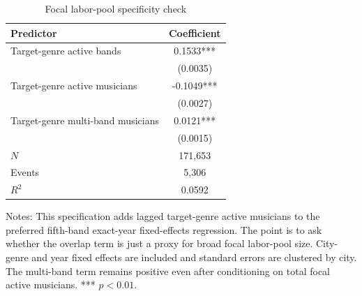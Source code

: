 \begin{table}[p]
\centering
\caption{Focal labor-pool specificity check}
\label{tab:appendix_threshold_specificity}
\small
\setlength{\tabcolsep}{4pt}
\renewcommand{\arraystretch}{1.08}
\begin{tabular}{@{}lc@{}}
\toprule
Predictor & Coefficient \\
\midrule
Target-genre active bands & 0.1533*** \\
 & (0.0035) \\
Target-genre active musicians & -0.1049*** \\
 & (0.0027) \\
Target-genre multi-band musicians & 0.0121*** \\
 & (0.0015) \\
\midrule
$N$ & 171,653 \\
Events & 5,306 \\
$R^2$ & 0.0592 \\
\bottomrule
\end{tabular}

\vspace{0.4em}
\parbox{0.88\textwidth}{\footnotesize Notes: This specification adds lagged target-genre active
musicians to the preferred fifth-band exact-year fixed-effects regression. The point is to ask
whether the overlap term is just a proxy for broad focal labor-pool size. City-genre and year
fixed effects are included and standard errors are clustered by city. The multi-band term remains
positive even after conditioning on total focal active musicians. *** $p<0.01$.}
\end{table}
